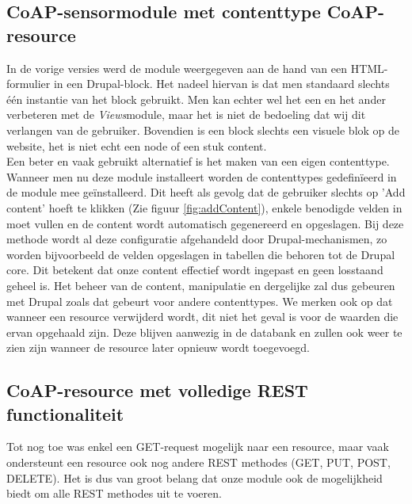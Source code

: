\subsection{CoAP-sensormodule met contenttype CoAP-resource}
In de vorige versies werd de module weergegeven aan de hand van een HTML-formulier in een Drupal-block. Het nadeel hiervan is dat men standaard slechts \'{e}\'{e}n instantie van het block gebruikt. Men kan echter wel het een en het ander verbeteren met de \textit{Views}module, maar het is niet de bedoeling dat wij dit verlangen van de gebruiker. Bovendien is een block slechts een visuele blok op de website, het is niet echt een node of een stuk content.\\

Een beter en vaak gebruikt alternatief is het maken van een eigen contenttype. Wanneer men nu deze module installeert worden de contenttypes gedefin\"{i}eerd in de module mee ge\"{i}nstalleerd. Dit heeft als gevolg dat de gebruiker slechts op 'Add content' hoeft te klikken (Zie figuur \ref{fig:addContent}), enkele benodigde velden in moet vullen en de content wordt automatisch gegenereerd en opgeslagen. Bij deze methode wordt al deze configuratie afgehandeld door Drupal-mechanismen, zo worden bijvoorbeeld de velden opgeslagen in tabellen die behoren tot de Drupal core. Dit betekent dat onze content effectief wordt ingepast en geen losstaand geheel is. Het beheer van de content, manipulatie en dergelijke zal dus gebeuren met Drupal zoals dat gebeurt voor andere contenttypes. We merken ook op dat wanneer een resource verwijderd wordt, dit niet het geval is voor de waarden die ervan opgehaald zijn. Deze blijven aanwezig in de databank en zullen ook weer te zien zijn wanneer de resource later opnieuw wordt toegevoegd.\\

\subsection{CoAP-resource met volledige REST functionaliteit} \label{rest}
Tot nog toe was enkel een GET-request mogelijk naar een resource, maar vaak ondersteunt een resource ook nog andere REST methodes (GET, PUT, POST, DELETE). Het is dus van groot belang dat onze module ook de mogelijkheid biedt om alle REST methodes uit te voeren.\\

